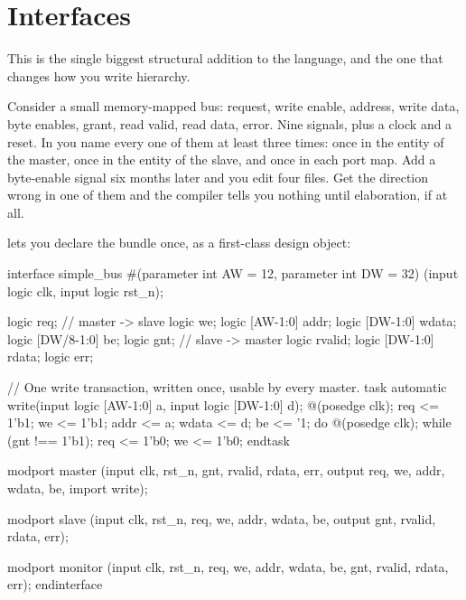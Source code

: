 \section{Interfaces}
\label{sec:beyond:interfaces}

This is the single biggest structural addition to the language, and the one
that changes how you write hierarchy.

Consider a small memory-mapped bus: request, write enable, address, write
data, byte enables, grant, read valid, read data, error. Nine signals, plus a
clock and a reset. In \VHDL{} you name every one of them at least three
times: once in the entity of the master, once in the entity of the slave, and
once in each port map. Add a byte-enable signal six months later and you edit
four files. Get the direction wrong in one of them and the compiler tells you
nothing until elaboration, if at all.

\SV{} lets you declare the bundle once, as a first-class design object:

\begin{svcode}[caption={A small memory-mapped bus as an interface},label={lst:beyond:iface}]
interface simple_bus #(parameter int AW = 12,
                       parameter int DW = 32)
                     (input logic clk, input logic rst_n);

  logic            req;      // master -> slave
  logic            we;
  logic [AW-1:0]   addr;
  logic [DW-1:0]   wdata;
  logic [DW/8-1:0] be;
  logic            gnt;      // slave  -> master
  logic            rvalid;
  logic [DW-1:0]   rdata;
  logic            err;

  // One write transaction, written once, usable by every master.
  task automatic write(input logic [AW-1:0] a,
                       input logic [DW-1:0] d);
    @(posedge clk);
    req <= 1'b1; we <= 1'b1; addr <= a; wdata <= d; be <= '1;
    do @(posedge clk); while (gnt !== 1'b1);
    req <= 1'b0; we <= 1'b0;
  endtask

  modport master  (input  clk, rst_n, gnt, rvalid, rdata, err,
                   output req, we, addr, wdata, be,
                   import write);

  modport slave   (input  clk, rst_n, req, we, addr, wdata, be,
                   output gnt, rvalid, rdata, err);

  modport monitor (input  clk, rst_n, req, we, addr, wdata, be,
                          gnt, rvalid, rdata, err);
endinterface
\end{svcode}

